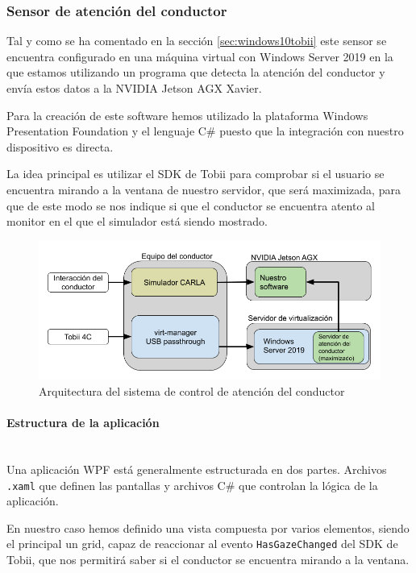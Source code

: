 \subsubsection{Sensor de atención del conductor} \label{sec:sensorAtencion}
Tal y como se ha comentado en la sección \ref{sec:windows10tobii} este sensor se encuentra configurado en una máquina virtual con Windows Server 2019 en la que estamos utilizando un programa que detecta la atención del conductor y envía estos datos a la NVIDIA Jetson AGX Xavier.

Para la creación de este software hemos utilizado la plataforma Windows Presentation Foundation y el lenguaje C\# puesto que la integración con nuestro dispositivo es directa.

La idea principal es utilizar el SDK de Tobii para comprobar si el usuario se encuentra mirando a la ventana de nuestro servidor, que será maximizada, para que de este modo se nos indique si que el conductor se encuentra atento al monitor en el que el simulador está siendo mostrado.

\begin{figure}[h!]
    \centering
    \includegraphics[width=\textwidth]{img/Arquitectura AtencionConductor.png}
    \caption{Arquitectura del sistema de control de atención del conductor}
\end{figure}


\paragraph{Estructura de la aplicación}\mbox{}\\
Una aplicación WPF está generalmente estructurada en dos partes. Archivos \texttt{.xaml} que definen las pantallas y archivos C\# que controlan la lógica de la aplicación.

En nuestro caso hemos definido una vista compuesta por varios elementos, siendo el principal un grid, capaz de reaccionar al evento \texttt{HasGazeChanged} del SDK de Tobii, que nos permitirá saber si el conductor se encuentra mirando a la ventana.

